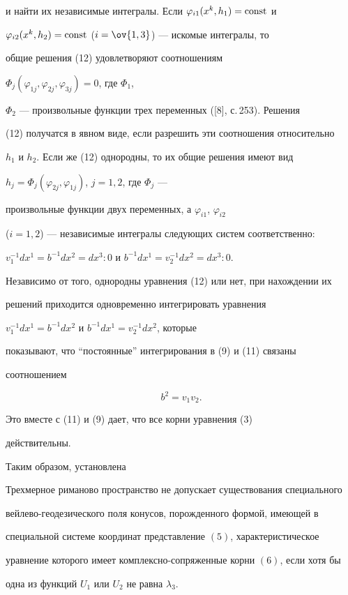 и найти их независимые интегралы. Если $\varphi_{i1}(x^k,h_1)=\operatorname{const}$ и 


$\varphi_{i2}(x^k,h_2)=\operatorname{const}$ ($i=\ov{1,3}$) --- искомые интегралы, то 


общие решения (12) удовлетворяют соотношениям 


$\Phi_j(\varphi_{1j},\varphi_{2j},\varphi_{3j})=0$, где $\Phi_1$, 


$\Phi_2$ --- произвольные функции трех переменных ([8], с.\,253). Решения 


(12) получатся в явном виде, если разрешить эти соотношения относительно 


$h_1$ и $h_2$. Если же (12) однородны, то их общие решения имеют вид 


$h_j=\Phi_j(\varphi_{2j},\varphi_{1j})$, $j=1,2$, где $\Phi_j$ --- 


произвольные функции двух переменных, а $\varphi_{i1}$, $\varphi_{i2}$ 


($i=1,2$) --- независимые интегралы следующих систем соответственно: 


$v^{-1}_1dx^1=b^{-1}dx^2=dx^3:0$ и $b^{-1}dx^1=v^{-1}_2dx^2=dx^3:0$. 


 


Независимо от того, однородны уравнения (12) или нет, при нахождении их 


решений приходится одновременно интегрировать уравнения 


$v^{-1}_1dx^1=b^{-1}dx^2$ и $b^{-1}dx^1=v^{-1}_2dx^2$, которые 


показывают, что ``постоянные'' интегрирования в (9) и (11) связаны 


соотношением 


\begin{equation} 


b^2=v_1v_2. 


\end{equation} 


Это вместе с (11) и (9) дает, что все корни уравнения (3) 


действительны. 


 


Таким образом, установлена 


 


\begin{lemnonum} 


Трехмерное риманово пространство не допускает существования специального 


вейлево-геодезического поля конусов, порожденного формой, имеющей в 


специальной системе координат представление $(5)$, характеристическое 


уравнение которого имеет комплексно-сопряженные корни $(6)$, если хотя бы 


одна из функций $U_1$ или $U_2$ не равна $\lambda_3$. 


\end{lemnonum} 


